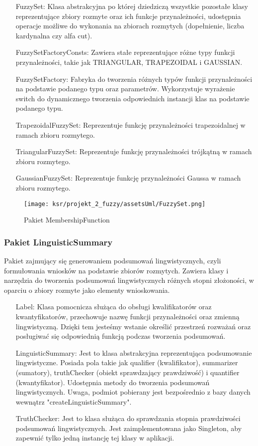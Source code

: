 \documentclass{article}
\begin{document}
\begin{itemize}
    \item[FuzzySet:] Klasa abstrakcyjna po której dziedziczą wszystkie pozostałe klasy reprezentujące zbiory rozmyte oraz ich funkcje przynależności, udostępnia operacje możliwe do wykonania na zbiorach rozmytych (dopełnienie, liczba kardynalna czy alfa cut). 
    \item[FuzzySetFactoryConsts:] Zawiera stałe reprezentujące różne typy funkcji przynależności, takie jak TRIANGULAR, TRAPEZOIDAL i GAUSSIAN.
    \item[FuzzySetFactory:] Fabryka do tworzenia różnych typów funkcji przynależności na podstawie podanego typu oraz parametrów.
    Wykorzystuje wyrażenie switch do dynamicznego tworzenia odpowiednich instancji klas na podstawie podanego typu.
    \item[TrapezoidalFuzzySet:] Reprezentuje funkcję przynależności trapezoidalnej w ramach zbioru rozmytego.
    \item[TriangularFuzzySet:] Reprezentuje funkcję przynależności trójkątną w ramach zbioru rozmytego.
    \item[GaussianFuzzySet:] Reprezentuje funkcję przynależności Gaussa w ramach zbioru rozmytego.
\end{itemize}

\begin{figure}[H]
\centering
\texttt{[image: ksr/projekt\_2\_fuzzy/assetsUml/FuzzySet.png]}
\caption{Pakiet MembershipFunction}
\label{fig:epsilon_bat}
\end{figure}

\subsubsection{Pakiet LinguisticSummary}

\noindent Pakiet zajmujący się generowaniem podsumowań lingwistycznych, czyli formułowania wniosków na podstawie zbiorów rozmytych. Zawiera klasy i narzędzia do tworzenia podsumowań lingwistycznych różnych stopni złożoności, w oparciu o zbiory rozmyte jako elementy wnioskowania.

\begin{itemize}
    \item[Label:] Klasa pomocnicza służąca do obsługi kwalifikatorów oraz kwantyfikatorów, przechowuje nazwę funkcji przynależności oraz zmienną lingwistyczną. Dzięki tem jesteśmy wstanie określić przestrzeń rozważań oraz posługiwać się odpowiednią funkcją podczas tworzenia podsumowań. 
    \item[LinguisticSummary:]  Jest to klasa abstrakcyjna reprezentująca podsumowanie lingwistyczne. Posiada pola takie jak qualifier (kwalifikator), summarizer (sumatory), truthChecker (obiekt sprawdzający prawdziwość) i quantifier (kwantyfikator). Udostępnia metody do tworzenia podsumowań lingwistycznych. Uwaga, podmiot pobierany jest bezpośrednio z bazy danych wewnątrz "createLinguisticSummary".
    \item[TruthChecker:] Jest to klasa służąca do sprawdzania stopnia prawdziwości podsumowań lingwistycznych. Jest zaimplementowana jako Singleton, aby zapewnić tylko jedną instancję tej klasy w aplikacji.
\end{itemize}
\end{document}
